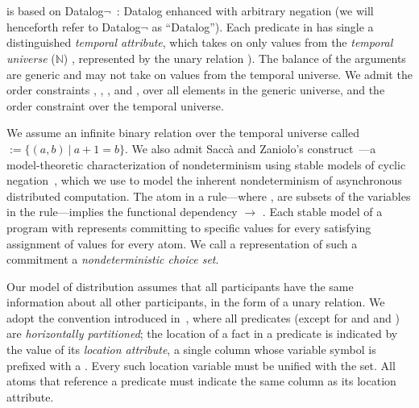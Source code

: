 \section{\large \bf \lang}
\label{sec:lang}

\lang is based on Datalog$\lnot$~\cite{ullmanbook}: Datalog enhanced with arbitrary negation (we will henceforth refer to Datalog$\lnot$ as ``Datalog'').  Each predicate in \lang has single a distinguished {\em temporal attribute}, which takes on only values from the {\em temporal universe} ($\mathbb{N}$)
, represented by the unary relation ).
The balance of the arguments are generic and may not take on values from the temporal universe.  We admit the order constraints \dedalus{<}, \dedalus{=}, \dedalus{!=}, and \dedalus{<=}, over all elements in the generic universe, and the order constraint \dedalus{<} over the temporal universe.

We assume an infinite binary relation over the temporal universe
called  $:= \{(a,b) \ | \ a + 1 = b\}$.  We also admit Sacc\`{a} and Zaniolo's  construct~\cite{sacca-zaniolo}---a model-theoretic characterization of nondeterminism using stable models of cyclic negation~\cite{stable-model}, which we use to model the inherent nondeterminism of asynchronous distributed computation.  The atom  in a rule---where ,  are subsets of the variables in the rule---implies the functional dependency  $\rightarrow$ .  Each stable model of a program with  represents committing to specific  values for every satisfying assignment of  values for every  atom.  We call a representation of such a commitment a {\em nondeterministic choice set}.

Our model of distribution assumes that all participants have the same information about all other participants, in the form of a unary  relation.  We adopt the convention introduced in~\cite{Loo:2005}, where all predicates (except for  and  and ) are {\em horizontally partitioned};  the location of a fact in a predicate is indicated by the value of its {\em location attribute}, a single column whose variable symbol is prefixed with a \dedalus{\#}.  Every such location variable must be unified with the  set.  All atoms that reference a predicate must indicate the same column as its location attribute.

